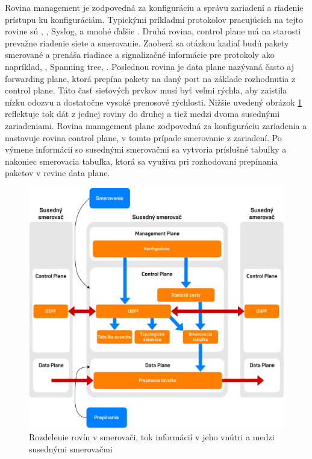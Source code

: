 Rovina management je zodpovedná za konfiguráciu a správu zariadení a riadenie prístupu ku konfiguráciám. Typickými príkladmi protokolov pracujúcich na tejto rovine sú , , Syslog,  a mnohé ďalšie \cite{Singh2018}. Druhá rovina, control plane má na starosti prevažne riadenie siete a smerovanie. Zaoberá sa otázkou kadiaľ budú pakety smerované a prenáša riadiace a signalizačné informácie pre protokoly ako napríklad, , Spanning tree,  \cite{Singh2018}. Poslednou rovina je data plane nazývaná často aj forwarding plane, ktorá prepína pakety na daný port na základe rozhodnutia z control plane. Táto časť sieťových prvkov musí byť veľmi rýchla, aby zaistila nízku odozvu a dostatočne vysoké prenosové rýchlosti. Nižšie uvedený obrázok \ref{fig:sdn-planes} reflektuje tok dát z jednej roviny do druhej a tiež medzi dvoma susednými zariadeniami. Rovina management plane zodpovedná za konfiguráciu zariadenia a nastavuje rovina control plane, v tomto prípade smerovanie z zariadení. Po výmene informácií so susednými smerovačmi sa vytvoria príslušné tabuľky a nakoniec smerovacia tabuľka, ktorá sa využíva pri rozhodovaní prepínania paketov v revine data plane.

\begin{figure}[H]
	\begin{center}
		\includegraphics[scale=0.6]{obrazky/SDN_planes.pdf}
	\end{center}
	\caption[Rozdelenie rovín v smerovači, tok informácií v jeho vnútri a medzi susednými smerovačmi]{Rozdelenie rovín v smerovači, tok informácií v jeho vnútri a medzi susednými smerovačmi \cite{Pepelnjak2013}}
	\label{fig:sdn-planes}
\end{figure} 


